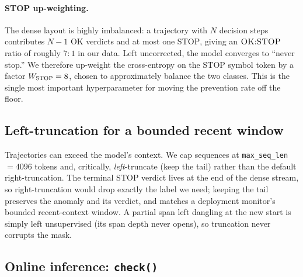 \paragraph{STOP up-weighting.}
The dense layout is highly imbalanced: a trajectory with $N$ decision steps
contributes $N{-}1$ \textsc{OK} verdicts and at most one \textsc{STOP}, giving an
$\textsc{OK}{:}\textsc{STOP}$ ratio of roughly $7{:}1$ in our data. Left
uncorrected, the model converges to ``never stop.'' We therefore up-weight the
cross-entropy on the \textsc{STOP} symbol token by a factor $W_{\textsc{STOP}}=8$,
chosen to approximately balance the two classes. This is the single most
important hyperparameter for moving the prevention rate off the floor.

\subsection{Left-truncation for a bounded recent window}
\label{sec:method:lefttrunc}

Trajectories can exceed the model's context. We cap sequences at
\texttt{max\_seq\_len}$=4096$ tokens and, critically, \emph{left}-truncate
(keep the tail) rather than the default right-truncation. The terminal
\textsc{STOP} verdict lives at the end of the dense stream, so right-truncation
would drop exactly the label we need; keeping the tail preserves the anomaly and
its verdict, and matches a deployment monitor's bounded recent-context window.
A partial span left dangling at the new start is simply left unsupervised (its
span depth never opens), so truncation never corrupts the mask.

\subsection{Online inference: \texttt{check()}}
\label{sec:method:check}

